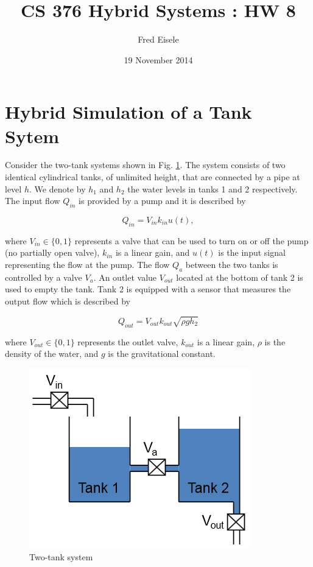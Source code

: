 \documentclass{article}
\title{CS 376 Hybrid Systems : HW 8}
\author{Fred Eisele}
\date{19 November 2014}
\begin{document}
\maketitle

\section{Hybrid Simulation of a Tank Sytem}
Consider the two-tank systems shown in Fig. \ref{fig:two-tanks}.
The system consists of two identical cylindrical tanks,
of unlimited height,
that are connected by a pipe at level $h$.
We denote by $h_1$ and $h_2$ the water levels in
tanks 1 and 2 respectively.
The input flow $Q_{in}$ is provided by a pump and
it is described by

\begin{equation}
Q_{in} = V_{in} k_{in} u(t),
\end{equation}

where $V_{in} \in \{0, 1\}$ represents a valve that can be
used to turn on or off the pump (no partially open valve),
$k_{in}$ is a linear gain, and $u(t)$ is the input
signal representing the flow at the pump.
The flow $Q_a$ between the two tanks is controlled by
a valve $V_a$. An outlet value $V_{out}$ located at the
bottom of tank 2 is used to empty the tank.
Tank 2 is equipped with a sensor that measures the output
flow which is described by

\begin{equation}
Q_{out} = V_{out} k_{out} \sqrt{\rho g h_{2}}
\end{equation}

where $V_{out} \in \{0, 1\}$ represents the outlet valve,
$k_{out}$ is a linear gain, $\rho$ is the density of
the water, and $g$ is the gravitational constant.

\begin{figure}[h!]
\centering
\includegraphics[scale=0.7]{hw8_two_tank_system.png}
\caption{Two-tank system}
\label{fig:two-tanks}
\end{figure}
\end{document}
